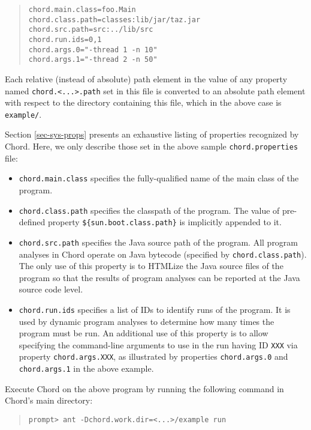 \documentclass{article}
\providecommand\Chord{Chord}
\begin{document}
\begin{quote}
\begin{verbatim}
chord.main.class=foo.Main
chord.class.path=classes:lib/jar/taz.jar
chord.src.path=src:../lib/src
chord.run.ids=0,1
chord.args.0="-thread 1 -n 10"
chord.args.1="-thread 2 -n 50"
\end{verbatim}
\end{quote}

Each relative (instead of absolute) path element in the value of any property
named \verb+chord.<...>.path+ set in this file is converted to an absolute path element with respect
to the directory containing this file, which in the above case is \verb+example/+.

Section \ref{sec-sys-props} presents an exhaustive
listing of properties recognized by \Chord.
Here, we only describe those set in the above
sample \verb+chord.properties+ file:

\begin{itemize}
\item
\verb+chord.main.class+ specifies the fully-qualified name of the main class of the
program.
\item
\verb+chord.class.path+ specifies the classpath of the program.
The value of pre-defined property \verb+${sun.boot.class.path}+ is implicitly appended
to it.
\item
\verb+chord.src.path+ specifies the Java source path of the program.
All program analyses in Chord operate on Java bytecode (specified by \verb+chord.class.path+).
The only use of this property is to HTMLize the Java source files of the program so that the
results of program analyses can be reported at the Java source code level.
\item
\verb+chord.run.ids+ specifies a list of IDs to identify runs of the program.
It is used by dynamic program analyses to determine how many times the program must be run.
An additional use of this property is to allow specifying the command-line arguments to use
in the run having ID \verb+XXX+ via property \verb+chord.args.XXX+, as illustrated by
properties \verb+chord.args.0+ and \verb+chord.args.1+ in the above example.
\end{itemize}

Execute Chord on the above program by running the following command in Chord's main directory:

\begin{quote}
\begin{verbatim}
prompt> ant -Dchord.work.dir=<...>/example run
\end{verbatim}
\end{quote}
\end{document}
